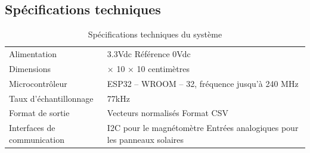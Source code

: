 \documentclass[a4paper,12pt]{article}
\begin{document}
\subsection{Spécifications techniques}
\begin{table}[H]
\centering
\renewcommand{\arraystretch}{1.3}
\begin{tabular}{|>{\raggedright\arraybackslash}m{4.5cm}|>{\raggedright\arraybackslash}m{8.5cm}|}
\hline
\rowcolor{blue!10}
Alimentation & 3.3Vdc \newline Référence 0Vdc \\

\rowcolor{blue!5}
Dimensions & 10 × 10 × 10 centimètres \\

\rowcolor{blue!10}
Microcontrôleur & ESP32 – WROOM – 32, fréquence jusqu’à 240 MHz  \\

\rowcolor{blue!5}
Taux d’échantillonnage & 77kHz \\

\rowcolor{blue!10}
Format de sortie & Vecteurs normalisés \newline Format CSV \\

\rowcolor{blue!5}
Interfaces de communication & I2C pour le magnétomètre \newline Entrées analogiques pour les panneaux solaires \\
\hline
\end{tabular}
\caption{Spécifications techniques du système }
\label{tab:specs}
\end{table}
\end{document}
